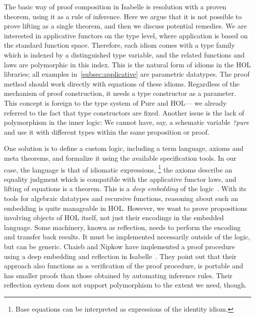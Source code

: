 The basic way of proof composition in Isabelle is resolution with a proven
theorem, using it as a rule of inference.
Here we argue that it is not possible to prove lifting as a single theorem, and
then we discuss potential remedies.
We are interested in applicative functors on the type level, where application
is based on the standard function space.
Therefore, each idiom comes with a type family which is indexed by a
distinguished type variable, and the related functions and laws are polymorphic
in this index.
This is the natural form of idioms in the HOL libraries; all examples
in~\ref{subsec:applicative} are parametric datatypes.
The proof method should work directly with equations of these idioms.
Regardless of the mechanism of proof construction, it needs a type constructor
as a parameter.
This concept is foreign to the type system of Pure and HOL---%
we already referred to the fact that type constructors are fixed.
Another issue is the lack of polymorphism in the inner logic:
We cannot have, say, a schematic variable \textit{?pure} and use it with
different types within the same proposition or proof.

One solution is to define a custom logic, including a term language, axioms
and meta theorems, and formalize it using the available specification tools.
In our case, the language is that of idiomatic expressions,%
\footnote{Base equations can be interpreted as expressions of the identity idiom.}
the axioms describe an equality judgment which is compatible with the
applicative functor laws, and lifting of equations is a theorem.
This is a \emph{deep embedding} of the logic~\cite{wildmoser04}.
With its tools for algebraic datatypes and recursive functions, reasoning about
such an embedding is quite manageable in HOL.
However, we want to prove propositions involving objects of HOL itself, not just
their encodings in the embedded language.
Some machinery, known as reflection, needs to perform the encoding and transfer
back results.
It must be implemented necessarily outside of the logic, but can be generic.
Chaieb and Nipkow have implemented a proof procedure using a deep embedding and
reflection in Isabelle~\cite{chaieb05}.
They point out that their approach also functions as a verification of the
proof procedure, is portable and has smaller proofs than those obtained by
automating inference rules.
Their reflection system does not support polymorphism to the extent we need,
though.

